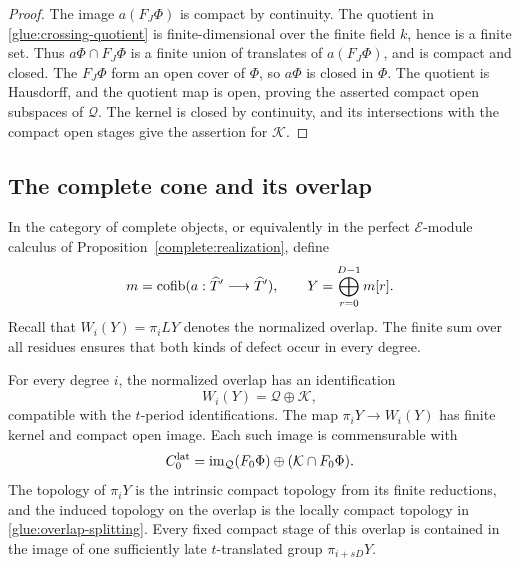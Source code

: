 \begin{proof}
The image $a(F_J\Phi)$ is compact by continuity. The quotient in
\eqref{glue:crossing-quotient} is finite-dimensional over the finite
field $k$, hence is a finite set. Thus $a\Phi\cap F_J\Phi$ is a
finite union of translates of $a(F_J\Phi)$, and is compact and
closed. The $F_J\Phi$ form an open cover of $\Phi$, so $a\Phi$ is
closed in $\Phi$. The quotient is Hausdorff, and the quotient map
is open, proving the asserted compact open subspaces of $\mathcal Q$.
The kernel is closed by continuity, and its intersections with the
compact open stages give the assertion for $\mathcal K$.
\end{proof}

\subsection{The complete cone and its overlap}

In the category of complete objects, or equivalently in the perfect
$\mathscr E$-module calculus of
Proposition~\ref{complete:realization}, define
\begin{equation}
 m=\operatorname{cofib}(a:\widehat T'\longrightarrow\widehat T'),
 \qquad Y=\bigoplus_{r=0}^{D-1}m[r].
 \label{glue:complete-object}
\end{equation}
Recall that $W_i(Y)=\pi_i LY$ denotes the normalized overlap.
The finite sum over all residues ensures that both kinds of defect
occur in every degree.

\begin{lemma}
\label{glue:overlap}
For every degree $i$, the normalized overlap has an identification
\begin{equation}
 W_i(Y)=\mathcal Q\oplus\mathcal K,
 \label{glue:overlap-splitting}
\end{equation}
compatible with the $t$-period identifications. The map
$\pi_iY\longrightarrow W_i(Y)$ has finite kernel and compact open
image. Each such image is commensurable with
\begin{equation}
 C_0^{\rm lat}=\operatorname{im}_{\mathcal Q}(F_0\Phi)
                     \oplus(\mathcal K\cap F_0\Phi).
 \label{glue:standard-compact}
\end{equation}
The topology of $\pi_iY$ is the intrinsic compact topology from its
finite reductions, and the induced topology on the overlap is the
locally compact topology in \eqref{glue:overlap-splitting}. Every
fixed compact stage of this overlap is contained in the image of
one sufficiently late $t$-translated group $\pi_{i+sD}Y$.
\end{lemma}

